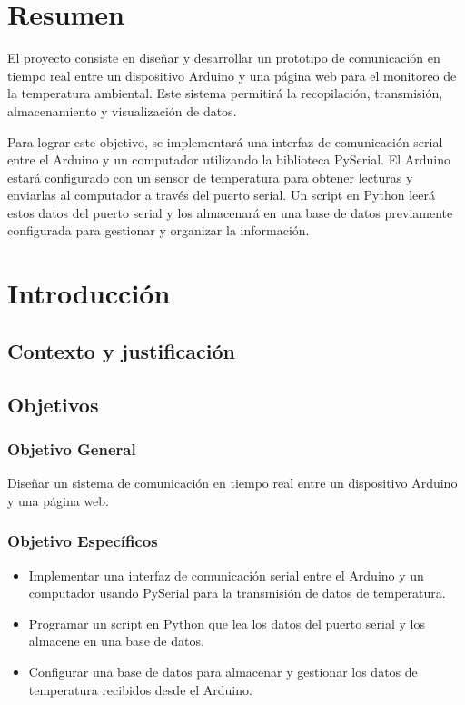 \documentclass[11pt,a4paper,openany]{report}
\author{Andrade oscco jose}
\begin{document}
	
	
\chapter{Resumen}
	
	El proyecto consiste en diseñar y desarrollar un prototipo de comunicación en tiempo real entre un dispositivo Arduino y una página web para el monitoreo de la temperatura ambiental. Este sistema permitirá la recopilación, transmisión, almacenamiento y visualización de datos.
	
	Para lograr este objetivo, se implementará una interfaz de comunicación serial entre el Arduino y un computador utilizando la biblioteca PySerial. El Arduino estará configurado con un sensor de temperatura para obtener lecturas y enviarlas al computador a través del puerto serial. Un script en Python leerá estos datos del puerto serial y los almacenará en una base de datos previamente configurada para gestionar y organizar la información.
	
\chapter{Introducción}
\section{Contexto y justificación}
	
\section{Objetivos}
\subsection{Objetivo General}
	Diseñar un  sistema de comunicación en tiempo real entre un dispositivo Arduino y una página web.
\subsection{Objetivo Específicos}
\begin{itemize}
		\item Implementar una interfaz de comunicación serial entre el Arduino y un computador usando PySerial para la transmisión de datos de temperatura.
		\item Programar un script en Python que lea los datos del puerto serial y los almacene en una base de datos.
		\item Configurar una base de datos para almacenar y gestionar los datos de temperatura recibidos desde el Arduino.
\end{itemize}
	
\end{document}
